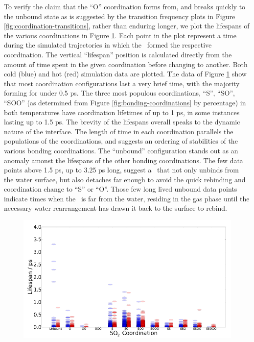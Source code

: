 To verify the claim that the ``O'' coordination forms from, and breaks quickly to the unbound state as is suggested by the transition frequency plots in Figure \ref{fig:coordination-transitions}, rather than enduring longer, we plot the lifespans of the various coordinations in Figure \ref{fig:coordination-lifespans}. Each point in the plot represent a time during the simulated trajectories in which the \suldiox~formed the respective coordination. The vertical ``lifespan'' position is calculated directly from the amount of time spent in the given coordination before changing to another. Both cold (blue) and hot (red) simulation data are plotted. The data of Figure \ref{fig:coordination-lifespans} show that most coordination configurations last a very brief time, with the majority forming for under 0.5 ps. The three most populous coordinations, ``S'', ``SO'', ``SOO'' (as determined from Figure \ref{fig:bonding-coordinations} by percentage) in both temperatures have coordination lifetimes of up to 1 ps, in some instances lasting up to 1.5 ps. The brevity of the lifespans overall speaks to the dynamic nature of the interface. The length of time in each coordination parallels the populations of the coordinations, and suggests an ordering of stabilities of the various bonding coordinations. The ``unbound'' configuration stands out as an anomaly amonst the lifespans of the other bonding coordinations. The few data points above 1.5 ps, up to 3.25 ps long, suggest a \suldiox~that not only unbinds from the water surface, but also detaches far enough to avoid the quick rebinding and coordination change to ``S'' or ``O''. Those few long lived unbound data points indicate times when the \suldiox~is far from the water, residing in the gas phase until the necessary water rearrangement  has drawn it back to the surface to rebind.

\begin{figure}[h!]
	\begin{center}
		\includegraphics[scale=1.0]{images/coordinations/coordination-lifespans.png}
		\caption{}
		\label{fig:coordination-lifespans}
	\end{center}
\end{figure}

